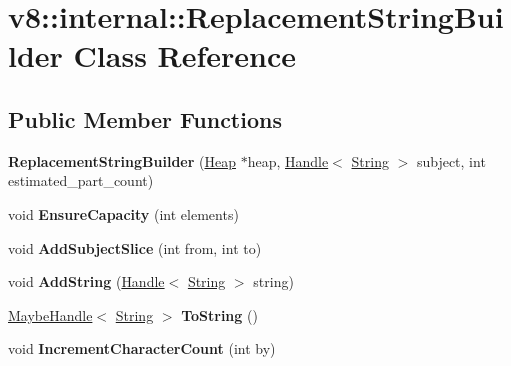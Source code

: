 \hypertarget{classv8_1_1internal_1_1_replacement_string_builder}{}\section{v8\+:\+:internal\+:\+:Replacement\+String\+Builder Class Reference}
\label{classv8_1_1internal_1_1_replacement_string_builder}
\subsection*{Public Member Functions}
\begin{DoxyCompactItemize}
\item 
{\bfseries Replacement\+String\+Builder} (\hyperlink{classv8_1_1internal_1_1_heap}{Heap} $\ast$heap, \hyperlink{classv8_1_1internal_1_1_handle}{Handle}$<$ \hyperlink{classv8_1_1internal_1_1_string}{String} $>$ subject, int estimated\+\_\+part\+\_\+count)\hypertarget{classv8_1_1internal_1_1_replacement_string_builder_aa6ed9782d2325a8fdd46a6e15393eece}{}\label{classv8_1_1internal_1_1_replacement_string_builder_aa6ed9782d2325a8fdd46a6e15393eece}

\item 
void {\bfseries Ensure\+Capacity} (int elements)\hypertarget{classv8_1_1internal_1_1_replacement_string_builder_aa9308f62a984d9fd648403128ed0118f}{}\label{classv8_1_1internal_1_1_replacement_string_builder_aa9308f62a984d9fd648403128ed0118f}

\item 
void {\bfseries Add\+Subject\+Slice} (int from, int to)\hypertarget{classv8_1_1internal_1_1_replacement_string_builder_ae8334fc56c55ed336a2a1d14b2fab3f5}{}\label{classv8_1_1internal_1_1_replacement_string_builder_ae8334fc56c55ed336a2a1d14b2fab3f5}

\item 
void {\bfseries Add\+String} (\hyperlink{classv8_1_1internal_1_1_handle}{Handle}$<$ \hyperlink{classv8_1_1internal_1_1_string}{String} $>$ string)\hypertarget{classv8_1_1internal_1_1_replacement_string_builder_a18e4204c090838012e9cca169c7302b6}{}\label{classv8_1_1internal_1_1_replacement_string_builder_a18e4204c090838012e9cca169c7302b6}

\item 
\hyperlink{classv8_1_1internal_1_1_maybe_handle}{Maybe\+Handle}$<$ \hyperlink{classv8_1_1internal_1_1_string}{String} $>$ {\bfseries To\+String} ()\hypertarget{classv8_1_1internal_1_1_replacement_string_builder_a3f24ac0bf599fc8de7972e53afa62ad7}{}\label{classv8_1_1internal_1_1_replacement_string_builder_a3f24ac0bf599fc8de7972e53afa62ad7}

\item 
void {\bfseries Increment\+Character\+Count} (int by)\hypertarget{classv8_1_1internal_1_1_replacement_string_builder_ac6b4287222a6e168b84cba200a290910}{}\label{classv8_1_1internal_1_1_replacement_string_builder_ac6b4287222a6e168b84cba200a290910}

\end{DoxyCompactItemize}
